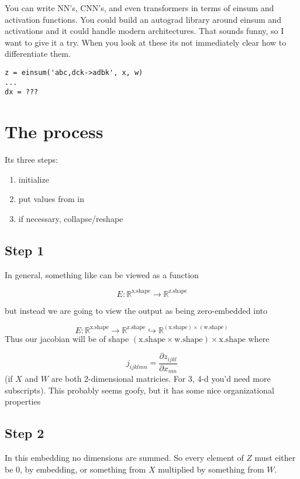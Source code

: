 \documentclass[11pt]{article}
\begin{document}
You can write NN's, CNN's, and even transformers in terms of einsum and activation functions.
You could build an autograd library around einsum and activations and it could handle modern architectures. That sounds funny, so I want to give it a try. 
When you look at these its not immediately clear how to differentiate them.
\begin{verbatim}
z = einsum('abc,dck->adbk', x, w)
...
dx = ???
\end{verbatim}

\section*{The process}

Its three steps:
\begin{enumerate}
    \item initialize 
    \item put values from  in 
    \item  if necessary, collapse/reshape  
\end{enumerate}

\subsection*{Step 1}
In general, something like  can be viewed as a function 

\[E : \mathbb{R}^{\text{x.shape}}\rightarrow \mathbb{R}^{\text{z.shape}}\]

but instead we are going to view the output as being zero-embedded into 

\[E : \mathbb{R}^{\text{x.shape}}\rightarrow \mathbb{R}^{\text{z.shape}} \hookrightarrow \mathbb{R}^{(\text{x.shape})\times(\text{w.shape})}\] 
Thus our jacobian will be of shape $(\text{x.shape} \times \text{w.shape}) \times \text{x.shape}$ where

\[
j_{ijklmn} = \frac{\partial z_{ijkl}}{\partial x_{mn}}
\]
(if $X$ and $W$ are both 2-dimensional matricies. For 3, 4-d you'd need more subscripts). 
This probably seems goofy, but it has some nice organizational properties 
\subsection*{Step 2}
In this embedding no dimensions are summed. So every element of $Z$ must either be $0$,
by embedding, or something from $X$ multiplied by something from $W$. 
\end{document}
